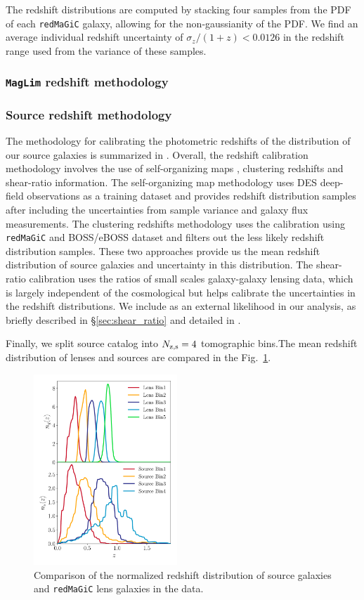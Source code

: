 \documentclass[fleqn,usenatbib]{mnras}
\newcommand{\redmagic}{\texttt{redMaGiC} }
\newcommand{\maglim}{\texttt{MagLim} }
\begin{document}
The redshift distributions are computed by stacking four samples from the PDF of each \redmagic galaxy, allowing for the non-gaussianity of the PDF. We find an average individual redshift uncertainty of $\sigma_z/(1+z) < 0.0126$ in the redshift range used from the variance of these samples.

\subsubsection{\maglim redshift methodology}

\subsubsection{Source redshift methodology}
\label{sec:sourcez}
The methodology for calibrating the photometric redshifts of the distribution of our source galaxies is summarized in \citet{y3-sompz}. Overall, the redshift calibration methodology involves the use of self-organizing maps \citep{y3-sompz}, clustering redshifts \citep{y3-sourcewz} and shear-ratio \citep{y3-shearratio} information. The self-organizing map methodology uses DES deep-field observations \citep{y3-deepfields} as a training dataset and provides redshift distribution samples after including the uncertainties from sample variance and galaxy flux measurements. The clustering redshifts methodology uses the calibration using \redmagic and BOSS/eBOSS dataset and filters out the less likely redshift distribution samples. These two approaches provide us the mean redshift distribution of source galaxies and uncertainty in this distribution. The shear-ratio calibration uses the ratios of small scales galaxy-galaxy lensing data, which is largely independent of the cosmological but helps calibrate the uncertainties in the redshift distributions. We include as an external likelihood in our analysis, as briefly described in \S\ref{sec:shear_ratio} and detailed in \citet{y3-shearratio}. 

Finally, we split source catalog into $N_{\rm z,s} = 4$ tomographic bins.The mean redshift distribution of lenses and sources are compared in the Fig.~\ref{fig:nz_comp}.
\begin{figure}
\includegraphics[width=0.48\textwidth]{figs/nz_DES.pdf}
\caption[]{Comparison of the normalized redshift distribution of source galaxies and \redmagic lens galaxies in the data.}
\label{fig:nz_comp}
\end{figure}
\end{document}
